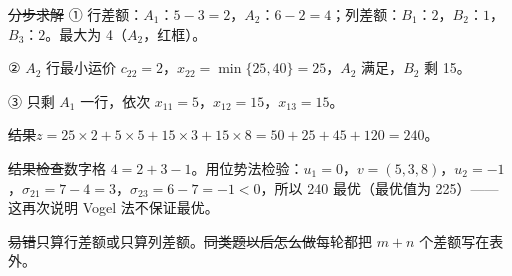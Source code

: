 \begin{center}\end{center}
\st{分步求解}
① 行差额：$A_1$：$5-3=2$，$A_2$：$6-2=4$；列差额：$B_1$：$2$，$B_2$：$1$，$B_3$：$2$。最大为 4（$A_2$，红框）。\par
② $A_2$ 行最小运价 $c_{22}=2$，$x_{22}=\min\{25,40\}=25$，$A_2$ 满足，$B_2$ 剩 15。\par
③ 只剩 $A_1$ 一行，依次 $x_{11}=5$，$x_{12}=15$，$x_{13}=15$。\par
\st{结果}$z=25\times2+5\times5+15\times3+15\times8=50+25+45+120=240$。\par
\st{结果检查}数字格 $4=2+3-1$。\supp 用位势法检验：$u_1=0$，$v=(5,3,8)$，$u_2=-1$，$\sigma_{21}=7-4=3$，$\sigma_{23}=6-7=-1<0$，所以 240 最优（最优值为 225）——这再次说明 Vogel 法不保证最优。\par
\st{易错}只算行差额或只算列差额。\quad\st{同类题以后怎么做}每轮都把 $m+n$ 个差额写在表外。


